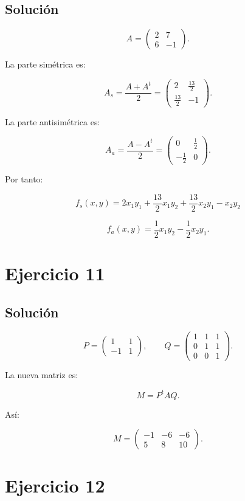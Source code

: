 \documentclass[11pt,a4paper]{article}
\begin{document}
\subsection{Solución}

\[
A=
\begin{pmatrix}
2&7\\
6&-1
\end{pmatrix}.
\]

La parte simétrica es:

\[
A_s=
\frac{A+A^t}{2}
=
\begin{pmatrix}
2&\frac{13}{2}\\
\frac{13}{2}&-1
\end{pmatrix}.
\]

La parte antisimétrica es:

\[
A_a=
\frac{A-A^t}{2}
=
\begin{pmatrix}
0&\frac12\\
-\frac12&0
\end{pmatrix}.
\]

Por tanto:

\[
\boxed{
f_s(x,y)
=
2x_1y_1
+
\frac{13}{2}x_1y_2
+
\frac{13}{2}x_2y_1
-
x_2y_2
}
\]

\[
\boxed{
f_a(x,y)
=
\frac12x_1y_2-\frac12x_2y_1.
}
\]

\section{Ejercicio 11}
\subsection{Solución}

\[
P=
\begin{pmatrix}
1&1\\
-1&1
\end{pmatrix},
\qquad
Q=
\begin{pmatrix}
1&1&1\\
0&1&1\\
0&0&1
\end{pmatrix}.
\]

La nueva matriz es:

\[
M=P^tAQ.
\]

Así:

\[
\boxed{
M=
\begin{pmatrix}
-1&-6&-6\\
5&8&10
\end{pmatrix}.
}
\]

\section{Ejercicio 12}
\end{document}
